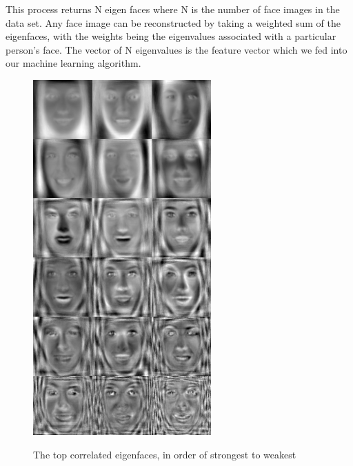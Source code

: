 \documentclass[10pt,twocolumn,letterpaper]{article}
\begin{document}
This process returns N eigen faces where N is the number of face images in the data set. Any face image can be reconstructed by taking a weighted sum of the eigenfaces, with the weights being the eigenvalues associated with a particular person's face. The vector of N eigenvalues is the feature vector which we fed into our machine learning algorithm. 

\begin {figure} [h]
    \centering
        \includegraphics[width = \linewidth]{eigens.png}
    \label{fig:corfaces}
    \caption{The top correlated eigenfaces, in order of strongest to weakest}
\end {figure}
\end{document}
